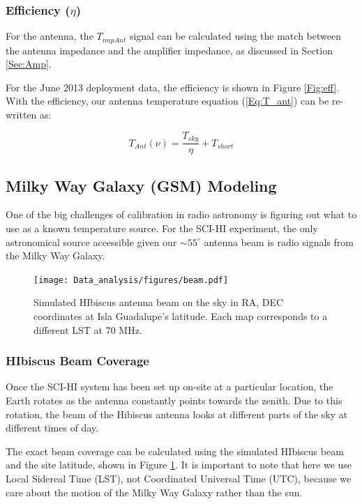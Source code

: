 \subsubsection{Efficiency ($\eta$)}
For the antenna, the $T_{impAnt}$ signal can be calculated using the match between the antenna impedance and the amplifier impedance, as discussed in Section \ref{Sec:Amp}. 

For the June 2013 deployment data, the efficiency is shown in Figure \ref{Fig:eff}. With the efficiency, our antenna temperature equation (\ref{Eq:T_ant}) can be re-written as:

\begin{equation}
T_{Ant}(\nu) = \frac{T_{sky}}{\eta} + T_{short}
\end{equation}


\subsection{Milky Way Galaxy (GSM) Modeling} \label{Sec:model}

One of the big challenges of calibration in radio astronomy is figuring out what to use as a known temperature source. For the SCI-HI experiment, the only astronomical source accessible given our $\sim 55 ^\circ$ antenna beam is radio signals from the Milky Way Galaxy. 

\begin{figure}[htb]
\begin{center}
\texttt{[image: Data\_analysis/figures/beam.pdf]}
\caption{Simulated HIbiscus antenna beam on the sky in RA, DEC coordinates at Isla Guadalupe's latitude. Each map corresponds to a different LST at 70 MHz. }
\label{Fig:HIbiscus_beam}
\end{center}
\end{figure}

\subsubsection{HIbiscus Beam Coverage}

Once the SCI-HI system has been set up on-site at a particular location, the Earth rotates as the antenna constantly points towards the zenith. Due to this rotation, the beam of the Hibiscus antenna looks at different parts of the sky at different times of day. 

The exact beam coverage can be calculated using the simulated HIbiscus beam and the site latitude, shown in Figure \ref{Fig:HIbiscus_beam}.  It is important to note that here we use Local Sidereal Time (LST), not Coordinated Universal Time (UTC), because we care about the motion of the Milky Way Galaxy rather than the sun.  

